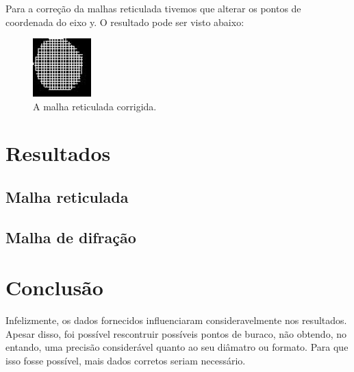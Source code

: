 \documentclass[10pt,a4paper]{article}
\begin{document}
Para a correção da malhas reticulada tivemos que alterar os pontos de
coordenada do eixo y. O resultado pode ser visto abaixo:


\begin{figure}[h!]
  \begin{center}
    \leavevmode
    \includegraphics[width=0.2\textwidth]{1novo}
  \end{center}
  \label{fig:malha2}
  \caption{A malha reticulada corrigida.}
\end{figure}

\section{Resultados}

\subsection{Malha reticulada}


\subsection{Malha de difração}


\section{Conclusão}

Infelizmente, os dados fornecidos influenciaram consideravelmente nos
resultados. Apesar disso, foi possível rescontruir possíveis pontos de
buraco, não obtendo, no entando, uma precisão considerável quanto ao seu
diâmatro ou formato. Para que isso fosse possível, mais dados corretos
seriam necessário.



\begin{small}
  
\end{small}
\end{document}

